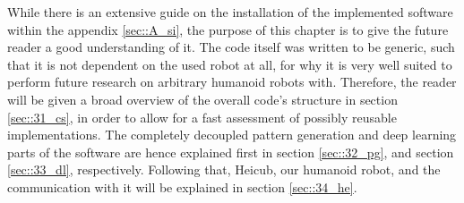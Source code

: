 \label{sec::3_me}
While there is an extensive guide on the installation of the implemented software within the appendix \ref{sec::A_si}, the purpose of this chapter is to give the future reader a good understanding of it. The code itself was written to be generic, such that it is not dependent on the used robot at all, for why it is very well suited to perform future research on arbitrary humanoid robots with. Therefore, the reader will be given a broad overview of the overall code's structure in section \ref{sec::31_cs}, in order to allow for a fast assessment of possibly reusable implementations. The completely decoupled pattern generation and deep learning parts of the software are hence explained first in section \ref{sec::32_pg}, and section \ref{sec::33_dl}, respectively. Following that, Heicub, our humanoid robot, and the communication with it will be explained in section \ref{sec::34_he}.








